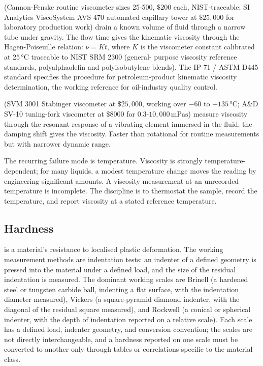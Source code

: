  (Cannon-Fenske routine viscometer
sizes 25-500, $\$200$ each, NIST-traceable; SI Analytics
ViscoSystem AVS 470 automated capillary tower at $\$25{,}000$
for laboratory production work) drain a known volume of fluid
through a narrow tube under gravity. The flow time gives the
kinematic viscosity through the Hagen-Poiseuille relation:
$\nu = K t$, where $K$ is the viscometer constant calibrated at
$25\,\si{\degreeCelsius}$ traceable to NIST SRM 2300 (general-
purpose viscosity reference standards, polyalphaolefin and
polyisobutylene blends). The IP 71 / ASTM D445 standard
specifies the procedure for petroleum-product kinematic
viscosity determination, the working reference for oil-industry
quality control.

 (SVM 3001 Stabinger
viscometer at $\$25{,}000$, working over $-60$ to $+135\,\si{
\degreeCelsius}$; A\&D SV-10 tuning-fork viscometer at $\$8000$
for $0.3$-$10{,}000\,\si{\milli\pascal\second}$) measure
viscosity through the resonant response of a vibrating element
immersed in the fluid; the damping shift gives the viscosity.
Faster than rotational for routine measurements but with
narrower dynamic range.

The recurring failure mode is temperature. Viscosity is strongly
temperature-dependent; for many liquids, a modest temperature
change moves the reading by engineering-significant amounts. A
viscosity measurement at an unrecorded temperature is incomplete.
The discipline is to thermostat the sample, record the temperature,
and report viscosity at a stated reference temperature.

\subsection{Hardness}

 is a material's resistance to localised plastic
deformation. The working measurement methods are indentation tests:
an indenter of a defined geometry is pressed into the material under
a defined load, and the size of the residual indentation is
measured. The dominant working scales are Brinell (a hardened steel
or tungsten carbide ball, indenting a flat surface, with the
indentation diameter measured), Vickers (a square-pyramid diamond
indenter, with the diagonal of the residual square measured), and
Rockwell (a conical or spherical indenter, with the depth of
indentation reported on a relative scale). Each scale has a defined
load, indenter geometry, and conversion convention; the scales are
not directly interchangeable, and a hardness reported on one scale
must be converted to another only through tables or correlations
specific to the material class.

